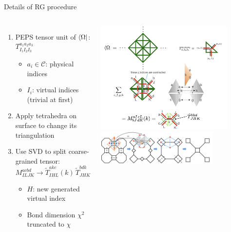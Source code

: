 \documentclass{fdubeamer}
\begin{document}
\begin{frame}{Details of RG procedure}

\begin{columns}[c]


    \begin{enumerate}
      \item PEPS tensor unit of $\bra{\Omega}$: $T^{a_1 a_2 a_3}_{I_1 I_2 I_3}$

        \begin{itemize}
          \item $a_i\in\mathcal{C}$: physical indices
          \item $I_i$: virtual indices (trivial at first)
        \end{itemize}

      \item Apply tetrahedra on surface to change its triangulation
      \item Use SVD to split coarse-grained tensor: $M^{acbd}_{ILJK}\to\tilde{T}^{akc}_{IHL}(k)\,\tilde{T}^{bdk}_{JHK}$

        \begin{itemize}
          \item $H$: new generated virtual index
          \item Bond dimension $\chi^2$ truncated to $\chi$
        \end{itemize}
    \end{enumerate}


    \centering
    \includegraphics[width=0.85\textwidth]{images/holographic/rg-2+1d-blocking.png} \\[1ex]
    \includegraphics[width=0.75\textwidth]{images/holographic/rg-2+1d.png}


\end{columns}
\end{frame}
\end{document}
